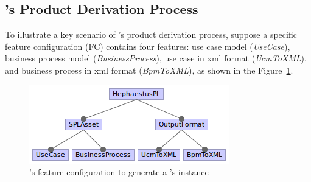


\subsection{\hpl's Product Derivation Process} \label{product-derivation-hpl}

To illustrate a key scenario of \hpl's product derivation process,
suppose a specific feature configuration (FC) contains four features: use case model (\emph{UseCase}), business process model (\emph{BusinessProcess}),
use case in xml format (\emph{UcmToXML}), and business process in xml format (\emph{BpmToXML}), as shown in the Figure~\ref{fig:fc-ucm-bpm}.

\begin{figure}[bth]
\begin{center}
\includegraphics[scale=0.8]{imagens/fc-ucm-bpm.png}
\end{center}
\caption{\hpl's feature configuration to generate a \hpl's instance}
\label{fig:fc-ucm-bpm}
\end{figure}

